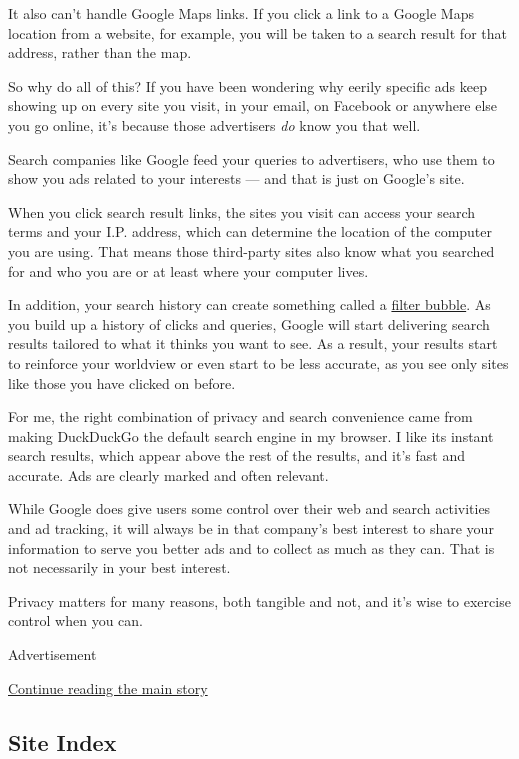 It also can't handle Google Maps links. If you click a link to a Google
Maps location from a website, for example, you will be taken to a search
result for that address, rather than the map.

So why do all of this? If you have been wondering why eerily specific
ads keep showing up on every site you visit, in your email, on Facebook
or anywhere else you go online, it's because those advertisers \emph{do}
know you that well.

Search companies like Google feed your queries to advertisers, who use
them to show you ads related to your interests --- and that is just on
Google's site.

When you click search result links, the sites you visit can access your
search terms and your I.P. address, which can determine the location of
the computer you are using. That means those third-party sites also know
what you searched for and who you are or at least where your computer
lives.

In addition, your search history can create something called a
\href{http://dontbubble.us/}{filter bubble}. As you build up a history
of clicks and queries, Google will start delivering search results
tailored to what it thinks you want to see. As a result, your results
start to reinforce your worldview or even start to be less accurate, as
you see only sites like those you have clicked on before.

For me, the right combination of privacy and search convenience came
from making DuckDuckGo the default search engine in my browser. I like
its instant search results, which appear above the rest of the results,
and it's fast and accurate. Ads are clearly marked and often relevant.

While Google does give users some control over their web and search
activities and ad tracking, it will always be in that company's best
interest to share your information to serve you better ads and to
collect as much as they can. That is not necessarily in your best
interest.

Privacy matters for many reasons, both tangible and not, and it's wise
to exercise control when you can.

Advertisement

\protect\hyperlink{after-bottom}{Continue reading the main story}

\hypertarget{site-index}{%
\subsection{Site Index}\label{site-index}}

